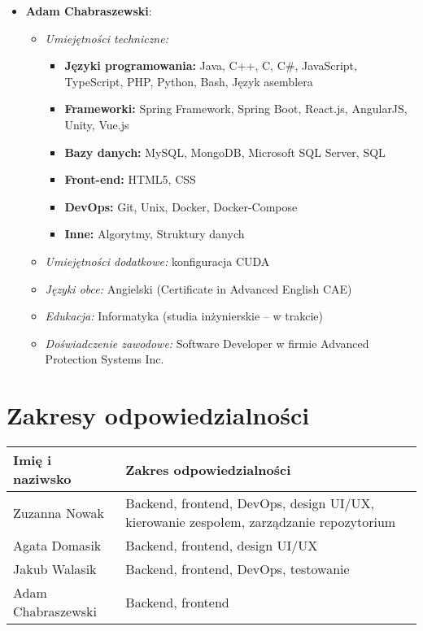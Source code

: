 \documentclass[12pt,a4paper]{book}
\begin{document}
\begin{itemize}
    \item \textbf{Adam Chabraszewski}:
    \begin{itemize}
        \item \textit{Umiejętności techniczne:} 
        \begin{itemize}
            \item \textbf{Języki programowania:} Java, C++, C, C\#, JavaScript, TypeScript, PHP, Python, Bash, Język asemblera
            \item \textbf{Frameworki:} Spring Framework, Spring Boot, React.js, AngularJS, Unity, Vue.js
            \item \textbf{Bazy danych:} MySQL, MongoDB, Microsoft SQL Server, SQL
            \item \textbf{Front-end:} HTML5, CSS
            \item \textbf{DevOps:} Git, Unix, Docker, Docker-Compose
            \item \textbf{Inne:} Algorytmy, Struktury danych
        \end{itemize}
        \item \textit{Umiejętności dodatkowe:} konfiguracja CUDA
        \item \textit{Języki obce:} Angielski (Certificate in Advanced English CAE)
        \item \textit{Edukacja:} Informatyka (studia inżynierskie – w trakcie)
        \item \textit{Doświadczenie zawodowe:} Software Developer w firmie Advanced Protection Systems Inc.
    \end{itemize}
\end{itemize}

\section{Zakresy odpowiedzialności}
\begin{center}
\begin{tabular}{|p{4.5cm}|p{8cm}|}
\hline
\textbf{Imię i naziwsko} & \textbf{Zakres odpowiedzialności} \\
\hline
Zuzanna Nowak &  Backend, frontend, DevOps, design UI/UX, kierowanie zespołem, zarządzanie repozytorium\\
\hline
Agata Domasik &  Backend, frontend, design UI/UX\\
\hline
Jakub Walasik &  Backend, frontend, DevOps, testowanie\\
\hline
Adam Chabraszewski & Backend, frontend\\
\hline
\end{tabular}
\end{center}
\end{document}
